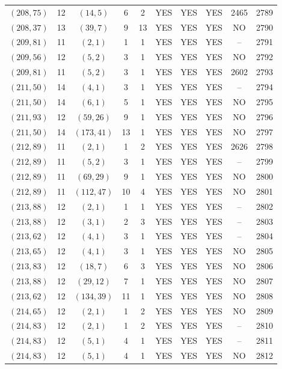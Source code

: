 \begin{longtable}{|c|c|c|c|c|c|c|c|c|c|}
$(208, 75)$ & 12 & $(14, 5)$ & 6 & 2 & YES & YES & YES & 2465 & 2789\\
$(208, 37)$ & 13 & $(39, 7)$ & 9 & 13 & YES & YES & YES & NO & 2790\\
$(209, 81)$ & 11 & $(2, 1)$ & 1 & 1 & YES & YES & YES & -- & 2791\\
$(209, 56)$ & 12 & $(5, 2)$ & 3 & 1 & YES & YES & YES & NO & 2792\\
$(209, 81)$ & 11 & $(5, 2)$ & 3 & 1 & YES & YES & YES & 2602 & 2793\\
$(211, 50)$ & 14 & $(4, 1)$ & 3 & 1 & YES & YES & YES & -- & 2794\\
$(211, 50)$ & 14 & $(6, 1)$ & 5 & 1 & YES & YES & YES & NO & 2795\\
$(211, 93)$ & 12 & $(59, 26)$ & 9 & 1 & YES & YES & YES & NO & 2796\\
$(211, 50)$ & 14 & $(173, 41)$ & 13 & 1 & YES & YES & YES & NO & 2797\\
$(212, 89)$ & 11 & $(2, 1)$ & 1 & 2 & YES & YES & YES & 2626 & 2798\\
$(212, 89)$ & 11 & $(5, 2)$ & 3 & 1 & YES & YES & YES & -- & 2799\\
$(212, 89)$ & 11 & $(69, 29)$ & 9 & 1 & YES & YES & YES & NO & 2800\\
$(212, 89)$ & 11 & $(112, 47)$ & 10 & 4 & YES & YES & YES & NO & 2801\\
$(213, 88)$ & 12 & $(2, 1)$ & 1 & 1 & YES & YES & YES & -- & 2802\\
$(213, 88)$ & 12 & $(3, 1)$ & 2 & 3 & YES & YES & YES & -- & 2803\\
$(213, 62)$ & 12 & $(4, 1)$ & 3 & 1 & YES & YES & YES & -- & 2804\\
$(213, 65)$ & 12 & $(4, 1)$ & 3 & 1 & YES & YES & YES & NO & 2805\\
$(213, 83)$ & 12 & $(18, 7)$ & 6 & 3 & YES & YES & YES & NO & 2806\\
$(213, 88)$ & 12 & $(29, 12)$ & 7 & 1 & YES & YES & YES & NO & 2807\\
$(213, 62)$ & 12 & $(134, 39)$ & 11 & 1 & YES & YES & YES & NO & 2808\\
$(214, 65)$ & 12 & $(2, 1)$ & 1 & 2 & YES & YES & YES & NO & 2809\\
$(214, 83)$ & 12 & $(2, 1)$ & 1 & 2 & YES & YES & YES & -- & 2810\\
$(214, 83)$ & 12 & $(5, 1)$ & 4 & 1 & YES & YES & YES & -- & 2811\\
$(214, 83)$ & 12 & $(5, 1)$ & 4 & 1 & YES & YES & YES & NO & 2812\\

\end{longtable}
